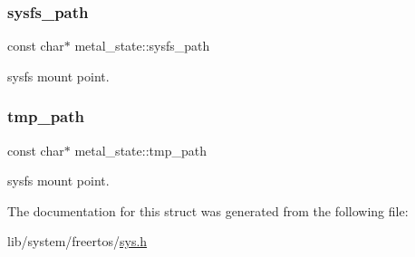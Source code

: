\subsubsection{\texorpdfstring{sysfs\+\_\+path}{sysfs\_path}}
{\footnotesize\ttfamily const char$\ast$ metal\+\_\+state\+::sysfs\+\_\+path}

sysfs mount point. \mbox{\label{structmetal__state_a290af954fe910c5caa1ded1e32e626b6}} 
\subsubsection{\texorpdfstring{tmp\+\_\+path}{tmp\_path}}
{\footnotesize\ttfamily const char$\ast$ metal\+\_\+state\+::tmp\+\_\+path}

sysfs mount point. 

The documentation for this struct was generated from the following file\+:\begin{DoxyCompactItemize}
\item 
lib/system/freertos/\hyperlink{system_2freertos_2sys_8h}{sys.\+h}\end{DoxyCompactItemize}
